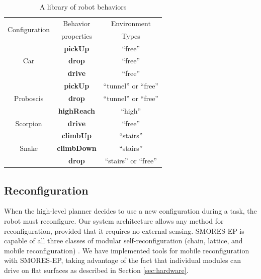 \documentclass[journal]{IEEEtran}
\begin{document}
%
\begin{table}
\centering
\begin{tabular}{ |c|c|c| } 
 \hline
 \multirow{2}{6em}{Configuration} & Behavior & Environment \\
 & properties & Types \\
 \hline
 \multirow{3}{*}{Car} & \textbf{pickUp} & ``free'' \\\cline{2-3}
  & \textbf{drop} & ``free'' \\\cline{2-3}
  & \textbf{drive} & ``free''\\ \hline
 \multirow{3}{*}{Proboscis} & \textbf{pickUp} & ``tunnel'' or ``free''\\ \cline{2-3}
  & \textbf{drop} &``tunnel'' or ``free'' \\ \cline{2-3}
  & \textbf{highReach} & ``high''\\ \hline
 Scorpion & \textbf{drive} & ``free''\\ \hline
 \multirow{3}{*}{Snake} & \textbf{climbUp} & ``stairs''\\ \cline{2-3}
  & \textbf{climbDown} & ``stairs''\\ \cline{2-3}
  & \textbf{drop} & ``stairs'' or ``free''\\
 \hline
\end{tabular}
\caption{A library of robot behaviors}
\label{table:1}
\vspace{-1em}
\end{table}

\subsection{Reconfiguration}
\label{sec:reconfiguration}
%
When the high-level planner decides to use a new configuration during a task, the robot must reconfigure. Our system architecture allows any method for reconfiguration, provided that it requires no external sensing. SMORES-EP is capable of all three classes of modular self-reconfiguration (chain, lattice, and mobile reconfiguration) \cite{Davey2012,yim2003modular}.  We have implemented tools for mobile reconfiguration with SMORES-EP, taking advantage of the fact that individual modules can drive on flat surfaces as described in Section \ref{sec:hardware}.
\end{document}
